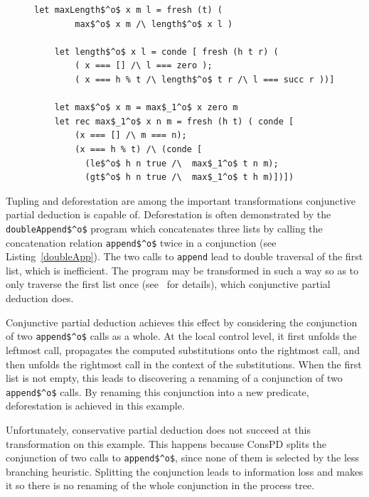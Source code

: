 \begin{figure}[!t]
  \centering
  \begin{minipage}{0.7\textwidth}
    \begin{lstlisting}[label={maxlen}, caption={Inefficient implementation of maxLength$^o$}, captionpos=b, frame=tb]
    let maxLength$^o$ x m l = fresh (t) (
        max$^o$ x m /\ length$^o$ x l )

    let length$^o$ x l = conde [ fresh (h t r) (
        ( x === [] /\ l === zero );
        ( x === h % t /\ length$^o$ t r /\ l === succ r ))]

    let max$^o$ x m = max$_1^o$ x zero m
    let rec max$_1^o$ x n m = fresh (h t) ( conde [
        (x === [] /\ m === n);
        (x === h % t) /\ (conde [
          (le$^o$ h n true /\  max$_1^o$ t n m);
          (gt$^o$ h n true /\  max$_1^o$ t h m)])])
    \end{lstlisting}
  \end{minipage}
\end{figure}

Tupling and deforestation are among the important transformations conjunctive partial deduction is capable of.
Deforestation is often demonstrated by the \lstinline{doubleAppend$^o$} program which concatenates three lists by calling the concatenation relation \lstinline{append$^o$} twice in a conjunction (see Listing~\ref{doubleApp}).
The two calls to \lstinline{append} lead to double traversal of the first list, which is inefficient.
The program may be transformed in such a way so as to only traverse the first list once (see~\cite{de1999conjunctive} for details), which conjunctive partial deduction does.

Conjunctive partial deduction achieves this effect by considering the conjunction of two \lstinline{append$^o$} calls as a whole.
At the local control level, it first unfolds the leftmost call, propagates the computed substitutions onto the rightmost call, and then unfolds the rightmost call in the context of the substitutions.
When the first list is not empty, this leads to discovering a renaming of a conjunction of two \lstinline{append$^o$} calls.
By renaming this conjunction into a new predicate, deforestation is achieved in this example.

Unfortunately, conservative partial deduction does not succeed at this transformation on this example.
This happens because ConsPD splits the conjunction of two calls to \lstinline{append$^o$}, since none of them is selected by the less branching heuristic.
Splitting the conjunction leads to information loss and makes it so there is no renaming of the whole conjunction in the process tree.


